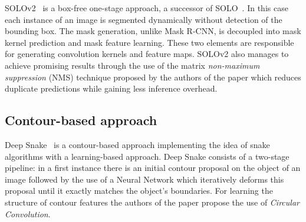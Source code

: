 \documentclass[10pt,twocolumn,letterpaper]{article}
\begin{document}
\noindent
\indent SOLOv2~\cite{Authors6_SOLOv2} is a box-free one-stage approach, a successor of SOLO~\cite{solo}.
In this case each instance of an image is segmented dynamically without detection of the bounding box.
The mask generation, unlike Mask R-CNN, is decoupled into mask kernel prediction and mask feature learning. These two elements are responsible for generating convolution kernels and feature maps. SOLOv2 also manages to achieve promising results through the use of the matrix \textit{non-maximum suppression} (NMS) technique proposed by the authors of the paper which reduces duplicate predictions while gaining less inference overhead.
\subsection{Contour-based approach}
Deep Snake~\cite{Authors7_deepsnake} is a contour-based approach implementing the idea of snake algorithms with a learning-based approach. Deep Snake consists of a two-stage pipeline: in a first instance there is an initial contour proposal on the object of an image followed by the use of a Neural Network which iteratively deforms this proposal until it exactly matches the object's boundaries. For learning the structure of contour features the authors of the paper propose the use of \textit{Circular Convolution}.
\end{document}
